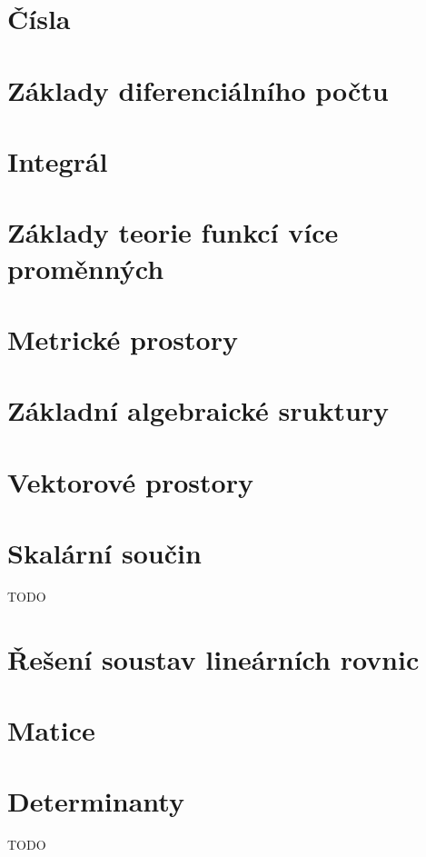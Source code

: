 


\section{Čísla}


\section{Základy diferenciálního počtu}


\section{Integrál}


\section{Základy teorie funkcí více proměnných}


\section{Metrické prostory}


\section{Základní algebraické sruktury}


\section{Vektorové prostory}


\section{Skalární součin}
TODO

\section{Řešení soustav lineárních rovnic}


\section{Matice}


\section{Determinanty}
TODO

